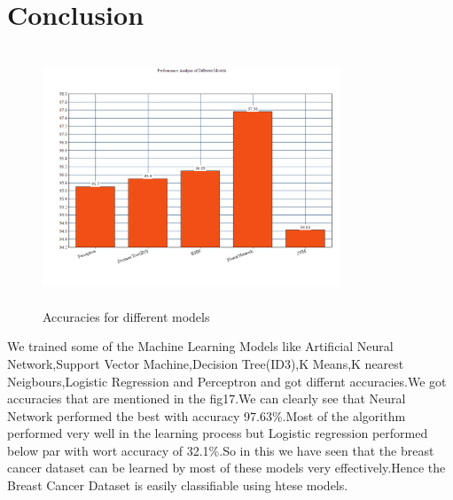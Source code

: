 \documentclass[conference,compsoc]{IEEEtran}
\begin{document}
\section{Conclusion}

\begin{figure}[H]
\centering
\includegraphics[width=3.5in,height=3in]{analysis_chart.png}
\caption{Accuracies for different models}
\label{fig_error}

\end{figure}  
We trained some of the Machine Learning Models like Artificial Neural Network,Support Vector Machine,Decision Tree(ID3),K Means,K nearest Neigbours,Logistic Regression and Perceptron and got differnt accuracies.We got accuracies that are mentioned in the fig17.We can clearly see that Neural Network performed the best with accuracy 97.63\%.Most of the algorithm performed very well in the learning process but Logistic regression performed below par with wort accuracy of 32.1\%.So in this we have seen that the breast cancer dataset can be learned by most of these models very effectively.Hence the Breast Cancer Dataset is easily classifiable
using htese models. 
\end{document}
